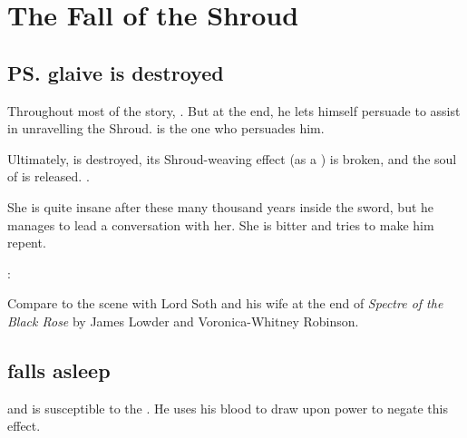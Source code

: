 \section{The Fall of the Shroud}
\subsection{\ps{\Ishnaruchaefir} glaive is destroyed}
Throughout most of the story, . But at the end, he lets himself persuade to assist in unravelling the Shroud. \Triestessakhin{} is the one who persuades him. 

Ultimately,  is destroyed, its Shroud-weaving effect (as a ) is broken, and the soul of \Triestessakhin{} is released. 
. 

She is quite insane after these many thousand years inside the sword, but he manages to lead a conversation with her. She is bitter and tries to make him repent. 

\Ishnaruchaefir: 

Compare to the scene with Lord Soth and his wife at the end of \emph{Spectre of the Black Rose} by James Lowder and Voronica-Whitney Robinson. 



% 







\subsection{\Vizsherioch falls asleep}
\Vizsherioch{}  and is susceptible to the . He uses his \bane{} blood to draw upon \Erebean{} power to negate this effect. 

